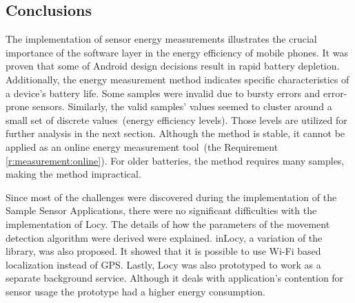 \subsection{Conclusions}
\hspace{10pt} The implementation of sensor energy measurements illustrates the crucial importance of the software layer in the energy efficiency of mobile phones. It was proven that some of Android design decisions result in rapid battery depletion. Additionally, the energy measurement method indicates specific characteristics of a device's battery life. Some samples were invalid due to bursty errors and error-prone sensors. Similarly, the valid samples' values seemed to cluster around a small set of discrete values\ (energy efficiency levels). Those levels are utilized for further analysis in the next section. Although the method is stable, it cannot be applied as an online energy measurement tool\ (the Requirement \ref{r:measurement:online}). For older batteries, the method requires many samples, making the method impractical.

Since most of the challenges were discovered during the implementation of the Sample Sensor Applications, there were no significant difficulties with the implementation of Locy. The details of how the parameters of the movement detection algorithm were derived were explained. inLocy, a variation of the library, was also proposed. It showed that it is possible to use Wi-Fi based localization instead of GPS. Lastly, Locy was also prototyped to work as a separate background service. Although it deals with application's contention for sensor usage the prototype had a higher energy consumption. 
